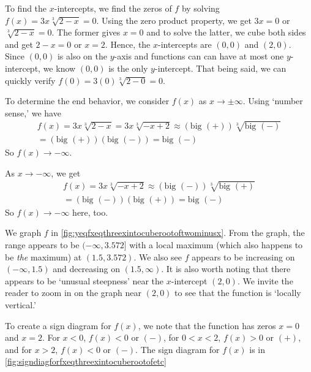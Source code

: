 \begin{ex}
\begin{enumerate}
To find the $x$-intercepts, we find the zeros of $f$ by solving $f(x) =  3x \sqrt[3]{2-x} = 0$.  Using the zero product property, we get $3x = 0$ or $\sqrt[3]{2-x} = 0$.  The former gives $x = 0$ and to solve the latter, we cube both sides and get $2 - x = 0$ or $x = 2$.  Hence, the $x$-intercepts are $(0,0)$ and $(2,0)$.  Since $(0,0)$ is also on the $y$-axis and functions can can have at most one $y$-intercept, we know $(0,0)$ is the only $y$-intercept.  That being said, we can quickly verify $f(0) = 3(0) \sqrt[3]{2-0} = 0$. 

To determine the end behavior, we consider $f(x)$ as $x \rightarrow \pm \infty$.  Using `number sense,'
we have
\begin{multline*}
  f(x) = 3x \sqrt[3]{2-x} = 3x \sqrt[3]{-x+2} \approx (\text{big $(+)$}) \sqrt[3]{\text{big $(-)$}} \\
  = (\text{big $(+)$})(\text{big $(-)$})
  = \text{big $(-)$}
\end{multline*}
So $f(x) \rightarrow -\infty$.
  
As $x \rightarrow -\infty$, we get
\begin{multline*}
  f(x) = 3x \sqrt[3]{-x+2} \approx (\text{big $(-)$}) \sqrt[3]{\text{big $(+)$}} \\
  = (\text{big $(-)$})(\text{big $(+)$}) = \text{big $(-)$}
\end{multline*}
So $f(x) \rightarrow -\infty$ here, too.

We graph $f$ in
\autoref{fig:yeqfxeqthreexintocuberootoftwominusx}.  From the graph, the range appears to be $(-\infty, 3.572]$ with a local maximum (which also happens to be \textit{the} maximum) at $(1.5, 3.572)$.  We also see $f$ appears to be increasing on $(-\infty, 1.5)$ and decreasing on $(1.5, \infty)$.  It is also worth noting that there appears to be `unusual steepness' near the $x$-intercept $(2,0)$.  We invite the reader to zoom in on the graph near $(2,0)$ to see that the function is `locally vertical.'

To create a sign diagram for $f(x)$, we note that the function has zeros $x = 0$ and $x=2$. For $x<0$, $f(x) < 0$ or $(-)$, for $0<x<2$, $f(x) > 0$ or $(+)$, and for $x>2$, $f(x) < 0$ or $(-)$. The sign diagram for $f(x)$ is in \autoref{fig:signdiagforfxeqthreexintocuberootofetc}


\end{enumerate}
\end{ex}
